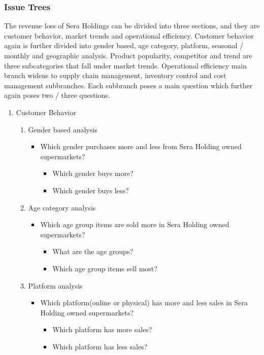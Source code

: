 \documentclass[12pt,a4Paper]{article}
\begin{document}
\subsubsection{Issue Trees}
The revenue loss of Sera Holdings can be divided into three sections, and they are customer behavior, market trends and operational efficiency. Customer behavior again is further divided into gender based, age category, platform, seasonal / monthly and geographic analysis. Product popularity, competitor and trend are three subcategories that fall under market trends. Operational efficiency main branch widens to supply chain management, inventory control and cost management subbranches. Each subbranch poses a main question which further again poses two / three questions. 
\begin{enumerate}
\item Customer Behavior
	\begin{enumerate}
	\item Gender based analysis
		\begin{itemize}
		\item Which gender purchases more and less from Sera Holding owned supermarkets?
			\begin{itemize}
			\item Which gender buys more?
			\item Which gender buys less?
			\end{itemize}
		\end{itemize}
	\item Age category analysis
		\begin{itemize}
		\item Which age group items are sold more in Sera Holding owned supermarkets?
			\begin{itemize}
			\item What are the age groups?
			\item Which age group items sell most?
			\end{itemize}
		\end{itemize}
	\item Platform analysis
		\begin{itemize}
		\item Which platform(online or physical) has more and less sales in Sera Holding owned supermarkets?
			\begin{itemize}
			\item Which platform has more sales?
			\item Which platform has less sales?
			\end{itemize}

\end{itemize}
\end{enumerate}
\end{enumerate}
\end{document}
